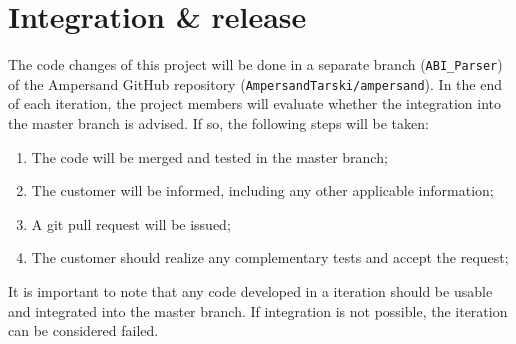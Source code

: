 
\section{Integration \& release}
\label{sec:integration-release}
%
%
The code changes of this project will be done in a separate branch (\texttt{ABI\_Parser}) of the Ampersand GitHub repository (\texttt{AmpersandTarski/ampersand}).
In the end of each iteration, the project members will evaluate whether the integration into the master branch is advised.
If so, the following steps will be taken:
\begin{enumerate}
	\item The code will be merged and tested in the master branch;
	\item The customer will be informed, including any other applicable information;
	\item A git pull request will be issued;
	\item The customer should realize any complementary tests and accept the request;
\end{enumerate}
%
It is important to note that any code developed in a iteration should be usable and integrated into the master branch.
If integration is not possible, the iteration can be considered failed.